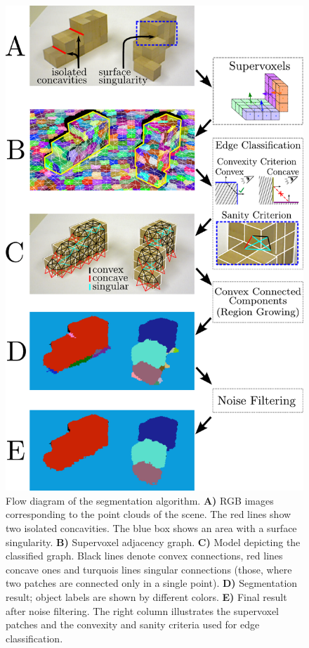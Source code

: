 \begin{figure}
\centering
  \includegraphics[width=0.8\linewidth]{figures/CVPR2014/flow_diagram}
    \caption[Flow Diagram of LCCP]{Flow diagram of the segmentation algorithm. \textbf{A)} RGB images corresponding to the point clouds of the scene. The red lines show two isolated concavities. The blue box shows an area with a surface singularity. \textbf{B)} Supervoxel adjacency graph. \textbf{C)} Model depicting the classified graph. Black lines denote convex connections, red lines concave ones and turquois lines singular connections (those, where two patches are connected only in a single point). \textbf{D)} Segmentation result; object labels are shown by different colors. \textbf{E)} Final result after noise filtering. The right column illustrates the supervoxel patches and the convexity and sanity criteria used for edge classification.}
  \label{fig:flow}
\end{figure}

